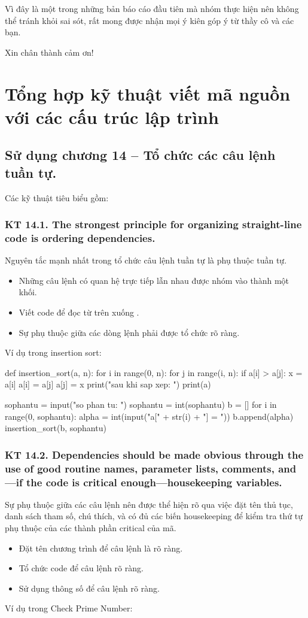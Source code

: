 \documentclass[12pt]{report}
\begin{document}
Vì đây là một trong những bản báo cáo đầu tiên mà nhóm thực hiện nên không thể tránh khỏi sai sót, rất mong được nhận mọi ý kiên góp ý từ thầy cô và các bạn. 

Xin chân thành cảm ơn!
\newpage 

\tableofcontents 
\newpage 

\section{\bfseries Tổng hợp kỹ thuật viết mã nguồn với các cấu trúc lập trình}

\subsection{Sử dụng chương 14 – Tổ chức các câu lệnh tuần tự.}
\noindent Các kỹ thuật tiêu biểu gồm: 

\subsubsection{KT 14.1. The strongest principle for organizing straight-line code is ordering dependencies.}
Nguyên tắc mạnh nhất trong tổ chức câu lệnh tuần tự là phụ thuộc tuần tự.
\begin{itemize}
	\item Những câu lệnh có quan hệ trực tiếp lẫn nhau được nhóm vào thành một khối.
	\item Viết code để đọc từ trên xuống .
	\item Sự phụ thuộc giữa các dòng lệnh phải được tổ chức rõ ràng.
\end{itemize}
Ví dụ trong insertion sort:
\begin{python}
def insertion_sort(a, n):
	for i in range(0, n):
		for j in range(i, n):
			if a[i] > a[j]:
				x = a[i]
				a[i] = a[j]
				a[j] = x
	print("\nDay sau khi sap xep: ")
	print(a)

sophantu = input("\nNhap so phan tu: ")
sophantu = int(sophantu)
b = []
for i in range(0, sophantu):
	alpha = int(input("a[" + str(i) + "] = "))
	b.append(alpha)
insertion_sort(b, sophantu)
\end{python}

\subsubsection{KT 14.2. Dependencies should be made obvious through the use of good routine names, parameter lists, comments, and—if the code is critical enough—housekeeping variables.}
Sự phụ thuộc giữa các câu lệnh nên được thể hiện rõ qua việc đặt tên thủ tục, danh sách tham số, chú thích, và có đủ các biến housekeeping để kiểm tra thứ tự phụ thuộc của các thành phần critical của mã.
\begin{itemize}
	\item Đặt tên chương trình để câu lệnh là rõ ràng.
	\item Tổ chức code để câu lệnh rõ ràng.
	\item Sử dụng thông số để câu lệnh rõ ràng.
\end{itemize}
Ví dụ trong Check Prime Number:
\end{document}

